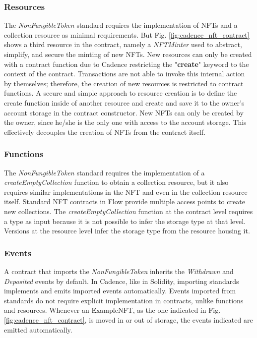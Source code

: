 \documentclass[../NFTComp_IEEE.tex]{subfiles}
\begin{document}
\subsubsection{Resources}
The \textit{NonFungibleToken} standard requires the implementation of NFTs and a collection resource as minimal requirements. But Fig. \ref{fig:cadence_nft_contract} shows a third resource in the contract, namely a \textit{NFTMinter} used to abstract, simplify, and secure the minting of new NFTs. New resources can only be created with a contract function due to Cadence restricting the "\textbf{create}" keyword to the context of the contract. Transactions are not able to invoke this internal action by themselves; therefore, the creation of new resources is restricted to contract functions. A secure and simple approach to resource creation is to define the create function inside of another resource and create and save it to the owner's account storage in the contract constructor. New NFTs can only be created by the owner, since he/she is the only one with access to the account storage. This effectively decouples the creation of NFTs from the contract itself.

\subsubsection{Functions}
The \textit{NonFungibleToken} standard requires the implementation of a \textit{createEmptyCollection} function to obtain a collection resource, but it also requires similar implementations in the NFT and even in the collection resource itself. Standard NFT contracts in Flow provide multiple access points to create new collections. The \textit{createEmptyCollection} function at the contract level requires a type as input because it is not possible to infer the storage type at that level. Versions at the resource level infer the storage type from the resource housing it.

\subsubsection{Events}
A contract that imports the \textit{NonFungibleToken} inherits the \textit{Withdrawn} and \textit{Deposited} events by default. In Cadence, like in Solidity, importing standards implements and emits imported events automatically. Events imported from standards do not require explicit implementation in contracts, unlike functions and resources. Whenever an ExampleNFT, as the one indicated in Fig. \ref{fig:cadence_nft_contract}, is moved in or out of storage, the events indicated are emitted automatically.
\end{document}
